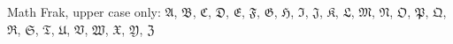 \bigskip

\noindent
Math Frak, upper case only:
\(\mathfrak{A}\), \(\mathfrak{B}\), \(\mathfrak{C}\), \(\mathfrak{D}\), \(\mathfrak{E}\), \(\mathfrak{F}\), \(\mathfrak{G}\), \(\mathfrak{H}\), \(\mathfrak{I}\), \(\mathfrak{J}\), \(\mathfrak{K}\), \(\mathfrak{L}\), \(\mathfrak{M}\), \(\mathfrak{N}\), \(\mathfrak{O}\), \(\mathfrak{P}\), \(\mathfrak{Q}\), \(\mathfrak{R}\), \(\mathfrak{S}\), \(\mathfrak{T}\), \(\mathfrak{U}\), \(\mathfrak{V}\), \(\mathfrak{W}\), \(\mathfrak{X}\), \(\mathfrak{Y}\), \(\mathfrak{Z}\)


